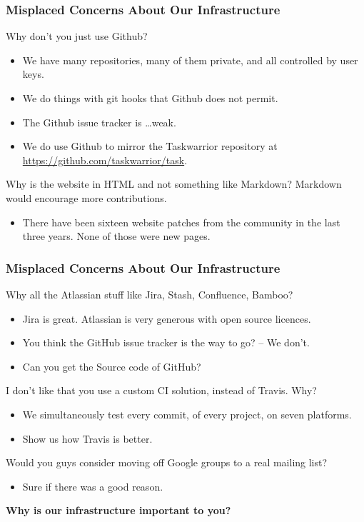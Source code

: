 \documentclass[t,handout]{beamer}
\begin{document}
\begin{frame}[fragile]\frametitle{Misplaced Concerns About Our Infrastructure}
    Why don't you just use Github?
    \begin{itemize}
        \item We have many repositories, many of them private, and all controlled by user keys.
        \item We do things with git hooks that Github does not permit.
        \item The Github issue tracker is \ldots weak.
        \item We do use Github to mirror the Taskwarrior repository at \href{https://github.com/taskwarrior/task}{https://github.com/taskwarrior/task}.
    \end{itemize}

    Why is the website in HTML and not something like Markdown? Markdown would encourage more contributions.
    \begin{itemize}
        \item There have been sixteen website patches from the community in the last three years. None of those were new pages.
    \end{itemize}
\end{frame}

\begin{frame}[fragile]\frametitle{Misplaced Concerns About Our Infrastructure}
    Why all the Atlassian stuff like Jira, Stash, Confluence, Bamboo?
    \begin{itemize}
        \item Jira is great. Atlassian is very generous with open source licences.
        \item You think the GitHub issue tracker is the way to go? -- We don't.
        \item Can you get the Source code of GitHub?
    \end{itemize}

    I don't like that you use a custom CI solution, instead of Travis. Why?
    \begin{itemize}
        \item We simultaneously test every commit, of every project, on seven platforms.
        \item Show us how Travis is better.
    \end{itemize}

    Would you guys consider moving off Google groups to a real mailing list?
    \begin{itemize}
        \item Sure if there was a good reason.
    \end{itemize}

    \textbf{Why is our infrastructure important to you?}
\end{frame}
\end{document}
